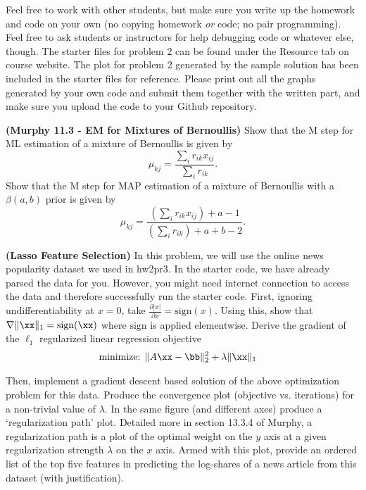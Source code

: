 \documentclass[12pt,letterpaper,fleqn]{hmcpset}
\begin{document}
Feel free to work with other students, but make sure you write up the homework
and code on your own (no copying homework \textit{or} code; no pair programming).
Feel free to ask students or instructors for help debugging code or whatever else,
though.
\newline
\newline
The starter files for problem 2 can be found under the Resource tab on course website. The plot for problem 2 generated by the sample solution has been included in the starter files for reference. Please print out all the graphs generated by your own code and submit them together with the written part, and make sure you upload the code to your Github repository.

\begin{problem}[1]
\textbf{(Murphy 11.3 - EM for Mixtures of Bernoullis)} Show that the M step for ML estimation
of a mixture of Bernoullis is given by
\[
    \mu_{kj} = \frac{\sum_i r_{ik}x_{ij}}{\sum_i r_{ik}}.
\]
Show that the M step for MAP estimation of a mixture of Bernoullis with a $\beta(a,b)$ prior
is given by
\[
    \mu_{kj} = \frac{\left(\sum_i r_{ik}x_{ij}\right) + a - 1}{\left(\sum_i r_{ik}\right) + a + b - 2}.
\]
\end{problem}
\begin{solution}
\vfill
\end{solution}
\newpage



\begin{problem}[2]
\textbf{(Lasso Feature Selection)} 
In this problem, we will use the online news popularity dataset we used in hw2pr3. In the starter code, we have already parsed the data for you. However, you might need internet connection to access the data and therefore successfully run the starter code.
\newline
\newline
First, ignoring undifferentiability at $x=0$, take $\frac{\partial |x|}{\partial x}
= \mathrm{sign} (x)$. Using this, show that $\nabla \|\xx\|_1 = \mathrm{sign}(\xx)$ where $\mathrm{sign}$ is applied
elementwise. Derive the gradient of the $\ell_1$ regularized linear regression objective
\begin{align*}
    \text{minimize: } & \|A\xx - \bb\|_2^2 + \lambda \|\xx\|_1
\end{align*}

Then, implement a gradient descent based solution of the above optimization problem for this data. Produce
the convergence plot (objective vs. iterations) for a non-trivial value of $\lambda$.
In the same figure (and different axes) produce a `regularization path' plot. Detailed
more in section 13.3.4 of Murphy, a regularization path is a plot of the optimal weight on
the $y$ axis at a given regularization strength $\lambda$ on the $x$ axis. Armed with this
plot, provide an ordered list of the top five features in predicting the log-shares of a news
article from this dataset (with justification).
\end{problem}
\begin{solution}
\vfill
\end{solution}
\newpage
\end{document}
